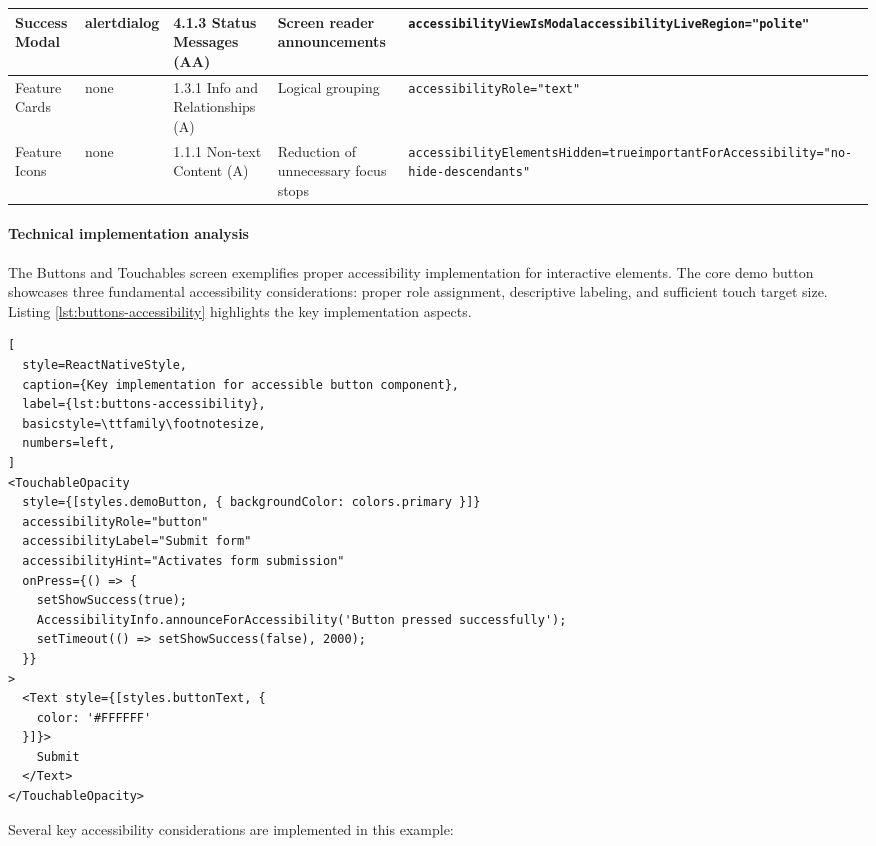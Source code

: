 \begin{longtable}{|p{2.5cm}|p{2cm}|p{2.8cm}|p{2.8cm}|p{4.3cm}|}
\hline
Success Modal & alertdialog & 4.1.3 Status Messages (AA) & Screen reader announcements & \texttt{accessibilityViewIsModal}\newline \texttt{accessibilityLiveRegion="polite"} \\
\hline
Feature Cards & none & 1.3.1 Info and Relationships (A) & Logical grouping & \texttt{accessibilityRole="text"} \\
\hline
Feature Icons & none & 1.1.1 Non-text Content (A) & Reduction of unnecessary focus stops & \texttt{accessibilityElementsHidden=true}\newline \texttt{importantForAccessibility="no-hide-descendants"} \\
\end{longtable}

\paragraph{Technical implementation analysis}

The Buttons and Touchables screen exemplifies proper accessibility implementation for interactive elements. The core demo button showcases three fundamental accessibility considerations: proper role assignment, descriptive labeling, and sufficient touch target size. Listing \ref{lst:buttons-accessibility} highlights the key implementation aspects.

\begin{lstlisting}[
  style=ReactNativeStyle,
  caption={Key implementation for accessible button component},
  label={lst:buttons-accessibility},
  basicstyle=\ttfamily\footnotesize,
  numbers=left,
]
<TouchableOpacity
  style={[styles.demoButton, { backgroundColor: colors.primary }]}
  accessibilityRole="button"
  accessibilityLabel="Submit form"
  accessibilityHint="Activates form submission"
  onPress={() => {
    setShowSuccess(true);
    AccessibilityInfo.announceForAccessibility('Button pressed successfully');
    setTimeout(() => setShowSuccess(false), 2000);
  }}
>
  <Text style={[styles.buttonText, {
    color: '#FFFFFF'
  }]}>
    Submit
  </Text>
</TouchableOpacity>
\end{lstlisting}

Several key accessibility considerations are implemented in this example:

